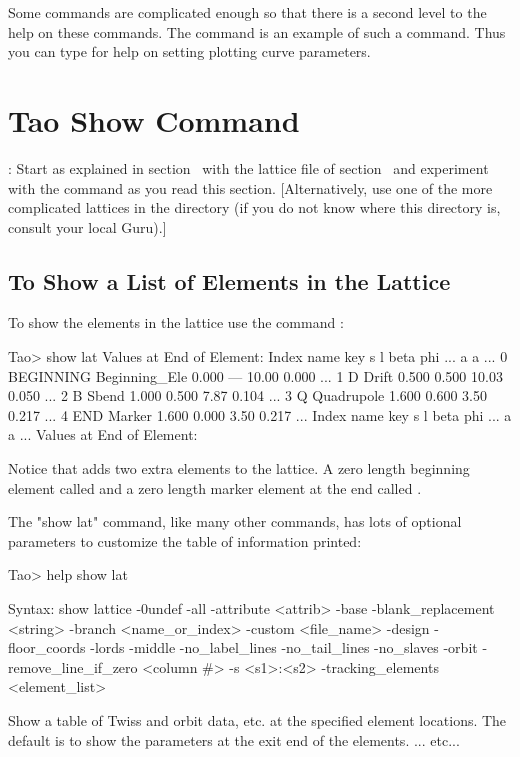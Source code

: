 \documentclass{hitec}
\newcommand{\Section}[1]{\section{#1}\vspace*{-1ex}}
\begin{document}
Some commands are complicated enough so that there is a second level to the help on these commands.
The  command is an example of such a command. Thus you can type  for
help on setting plotting curve parameters.

\Section{Tao Show Command}

: Start \tao as explained in section~ with the lattice file
 of section~ and experiment with the  command as you read
this section. [Alternatively, use one of the more complicated lattices in the
 directory (if you do not know where this directory is, consult
your local \bmad Guru).]

\subsection{To Show a List of Elements in the Lattice}

To show the elements in the lattice use the command :
{\small
\begin{code}
 Tao> show lat
      Values at End of Element:
 Index  name      key                       s       l    beta     phi ...
                                                            a       a ...
     0  BEGINNING Beginning_Ele         0.000     ---   10.00   0.000 ...
     1  D         Drift                 0.500   0.500   10.03   0.050 ...
     2  B         Sbend                 1.000   0.500    7.87   0.104 ...
     3  Q         Quadrupole            1.600   0.600    3.50   0.217 ...
     4  END       Marker                1.600   0.000    3.50   0.217 ...
 Index  name      key                       s       l    beta     phi ...
                                                            a       a ...
      Values at End of Element:
\end{code}}

Notice that \bmad adds two extra elements to the lattice. A zero length beginning element called 
and a zero length marker element at the end called .

The "show lat" command, like many other commands, has lots of optional parameters to customize the
table of information printed:

{\small
\begin{code}
Tao> help show lat

Syntax:
  show lattice {-0undef} {-all} {-attribute <attrib>} {-base}
      {-blank_replacement <string>}  {-branch <name_or_index>}
      {-custom <file_name>} {-design} {-floor_coords} {-lords} {-middle}
      {-no_label_lines} {-no_tail_lines} {-no_slaves} {-orbit} 
      {-remove_line_if_zero <column #>} {-s <s1>:<s2>} {-tracking_elements}
      {<element_list>}

Show a table of Twiss and orbit data, etc. at the specified element locations. 
The default is to show the parameters at the exit end of the elements. 
... etc...
\end{code}}
\end{document}
